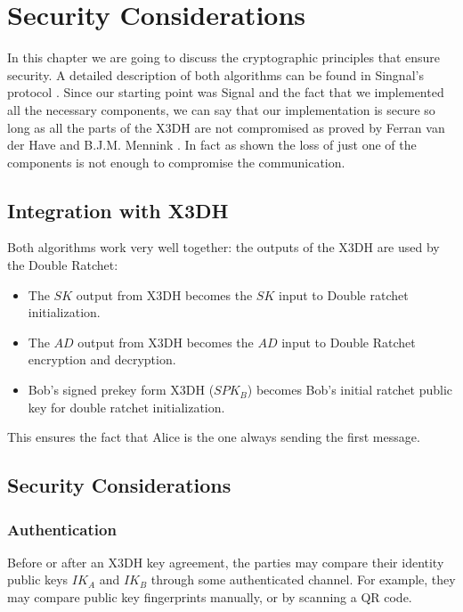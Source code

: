 \chapter{Security Considerations}
\label{cha:Security}

In this chapter we are going to discuss the cryptographic principles that ensure security. A detailed description of both algorithms can be found in Singnal's protocol \cite{x3dh} \cite{DoubleRachet}. Since our starting point was Signal and the fact that we implemented all the necessary components, we can say that our implementation is secure so long as all the parts of the X3DH are not compromised as proved by Ferran van der Have and B.J.M. Mennink \cite{X3DHproof}. In fact as shown the loss of just one of the components is not enough to compromise the communication.

\section{Integration with X3DH}
\label{sec:IntegrationWithX3DH}

Both algorithms work very well together: the outputs of the X3DH are used by the Double Ratchet:
\begin{itemize}
  \item The $SK$ output from X3DH becomes the $SK$ input to Double ratchet initialization.
  \item The $AD$ output from X3DH becomes the $AD$ input to Double Ratchet encryption and decryption.
  \item Bob's signed prekey form X3DH ($SPK_B$) becomes Bob's initial ratchet public key for double ratchet initialization.
\end{itemize}

This ensures the fact that Alice is the one always sending the first message.

\section{Security Considerations}
\label{sec:SecurityConsideration}

\subsection{Authentication}
\label{subsec:Authentication}

Before or after an X3DH key agreement, the parties may compare their identity public keys $IK_A$ and $IK_B$ through some authenticated channel. For example, they may compare public key fingerprints manually, or by scanning a QR code.

